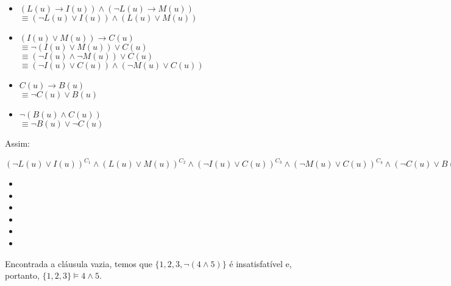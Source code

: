 \begin{rexercises}
\begin{question}
\begin{resolution}
            \begin{itemize}
                \item $(L(u) \rightarrow I(u)) \land (\neg L(u) \rightarrow M(u))$
                \\ $\equiv (\neg L(u) \lor I(u)) \land (L(u) \lor M(u))$ 
                \item $(I(u) \lor M(u)) \rightarrow C(u)$
                \\ $\equiv \neg(I(u) \lor M(u)) \lor C(u)$
                \\ $\equiv (\neg I(u) \land \neg M(u)) \lor C(u)$
                \\ $\equiv (\neg I(u) \lor C(u)) \land (\neg M(u) \lor C(u))$ 
                \item $C(u) \rightarrow B(u)$
                \\ $\equiv \neg C(u) \lor B(u)$ 
                \item $\neg (B(u) \land C(u))$
                \\ $\equiv \neg B(u) \lor \neg C(u)$ 
            \end{itemize}

            Assim:
            \begin{center}
                $(\neg L(u) \lor I(u))^{C_1} \land (L(u) \lor M(u))^{C_2} \land (\neg I(u) \lor C(u))^{C_3} \land (\neg M(u) \lor C(u))^{C_4} \land (\neg C(u) \lor B(u))^{C_5} \land (\neg B(u) \lor \neg C(u))^{C_6}$
            \end{center}

            \begin{itemize}
                \item[] 
                \item[] 
                \item[] 
                \item[] 
                \item[] 
                \item[]   
            \end{itemize}
            Encontrada a cláusula vazia, temos que $\{1, 2, 3, \neg (4 \land 5)\}$ é insatisfatível e, portanto, $\{1, 2, 3\} \vDash 4 \land 5$.
        \end{resolution}
    \end{question}


\end{rexercises}
